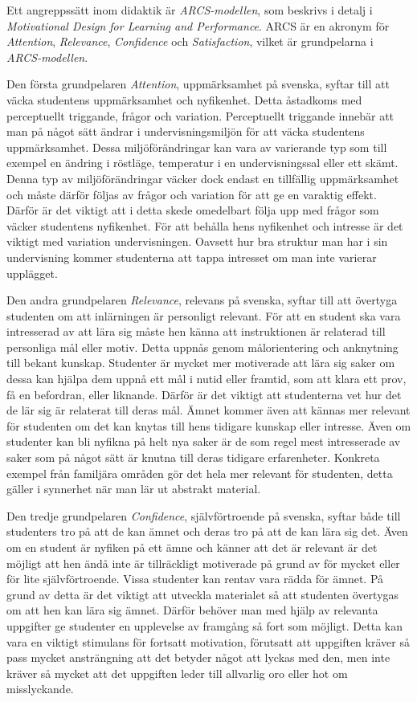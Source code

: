 \documentclass[]{article}
\begin{document}
Ett angreppssätt inom didaktik är \textit{ARCS-modellen}, som beskrivs
i detalj i \textit{Motivational Design for Learning and Performance}.
ARCS är en akronym för \textit{Attention}, \textit{Relevance},
\textit{Confidence} och \textit{Satisfaction}, vilket är grundpelarna
i \textit{ARCS-modellen}.

Den första grundpelaren \textit{Attention}, uppmärksamhet på svenska,
syftar till att väcka studentens uppmärksamhet och nyfikenhet.
Detta åstadkoms med perceptuellt triggande, frågor och variation.
Perceptuellt triggande innebär att man på något sätt ändrar i
undervisningsmiljön för att väcka studentens uppmärksamhet. Dessa
miljöförändringar kan vara av varierande typ som till exempel en
ändring i röstläge, temperatur i en undervisningssal eller ett skämt.
Denna typ av miljöförändringar väcker dock endast en tillfällig
uppmärksamhet och måste därför följas av frågor och variation för att
ge en varaktig effekt. Därför är det viktigt att i detta skede
omedelbart följa upp med frågor som väcker studentens nyfikenhet. För
att behålla hens nyfikenhet och intresse är det viktigt med variation
undervisningen. Oavsett hur bra struktur man har i sin undervisning
kommer studenterna att tappa intresset om man inte varierar upplägget.

Den andra grundpelaren \textit{Relevance}, relevans på svenska, syftar
till att övertyga studenten om att inlärningen är personligt relevant.
För att en student ska vara intresserad av att lära sig måste hen
känna att instruktionen är relaterad till personliga mål eller motiv.
Detta uppnås genom målorientering och anknytning till bekant kunskap.
Studenter är mycket mer motiverade att lära sig saker om dessa kan
hjälpa dem uppnå ett mål i nutid eller framtid, som att klara ett
prov, få en befordran, eller liknande. Därför är det viktigt att
studenterna vet hur det de lär sig är relaterat till deras mål. Ämnet
kommer även att kännas mer relevant för studenten om det kan knytas
till hens tidigare kunskap eller intresse. Även om studenter kan bli
nyfikna på helt nya saker är de som regel mest intresserade av saker
som på något sätt är knutna till deras tidigare erfarenheter.
Konkreta exempel från familjära områden gör det hela mer relevant för
studenten, detta gäller i synnerhet när man lär ut abstrakt material.

Den tredje grundpelaren \textit{Confidence}, självförtroende på
svenska, syftar både till studenters tro på att de kan ämnet och deras
tro på att de kan lära sig det. Även om en student är nyfiken på ett
ämne och känner att det är relevant är det möjligt att hen ändå inte
är tillräckligt motiverade på grund av för mycket eller för lite
självförtroende. Vissa studenter kan rentav vara rädda för ämnet. På
grund av detta är det viktigt att utveckla materialet så att studenten
övertygas om att hen kan lära sig ämnet. Därför behöver man med hjälp
av relevanta uppgifter ge studenter en upplevelse av framgång så fort
som möjligt. Detta kan vara en viktigt stimulans för fortsatt
motivation, förutsatt att uppgiften kräver så pass mycket ansträngning
att det betyder något att lyckas med den, men inte kräver så mycket
att det uppgiften leder till allvarlig oro eller hot om misslyckande.
\end{document}
